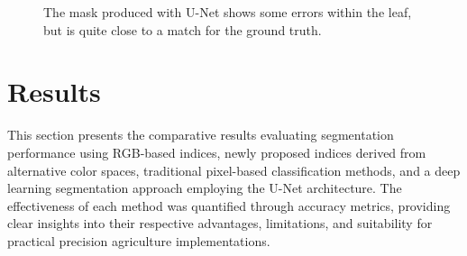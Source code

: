 \documentclass[agriculture,article,submit,pdftex,moreauthors]{Definitions/mdpi}
\begin{document}
\begin{figure}[H]
	\centering
	\label{fig:original}
	\hfill
	\label{fig:mask}
	\hfill
	\label{fig:original-masked}
	\caption[U-Net segmentation vs ground truth]{The mask produced with U-Net shows some errors within the leaf, but is quite close to a match for the ground truth.}
	\label{fig:u-net-segmentation}
\end{figure}

%
%

\section{Results}
\label{section:results}
This section presents the comparative results evaluating segmentation performance using RGB-based indices, newly proposed indices derived from alternative color spaces, traditional pixel-based classification methods, and a deep learning segmentation approach employing the U-Net architecture. The effectiveness of each method was quantified through accuracy metrics, providing clear insights into their respective advantages, limitations, and suitability for practical precision agriculture implementations.
\end{document}
